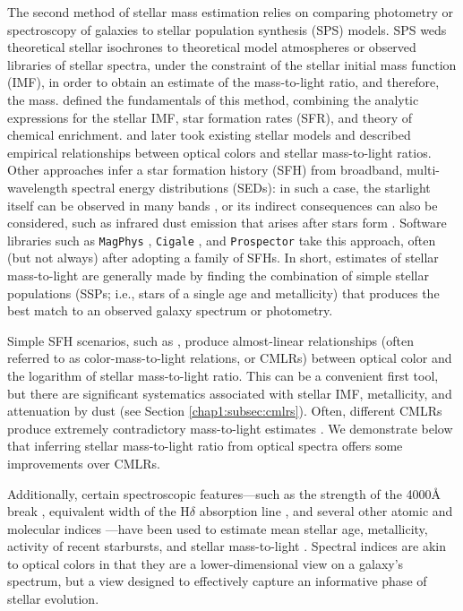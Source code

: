 The second method of stellar mass estimation relies on comparing photometry or spectroscopy of galaxies to stellar population synthesis (SPS) models. SPS weds theoretical stellar isochrones to theoretical model atmospheres or observed libraries of stellar spectra, under the constraint of the stellar initial mass function (IMF), in order to obtain an estimate of the mass-to-light ratio, and therefore, the mass. \citet{tinsley_72,tinsley_73} defined the fundamentals of this method, combining the analytic expressions for the stellar IMF, star formation rates (SFR), and theory of chemical enrichment. \citet{bell_dejong_01} and \citet{bell_03} later took existing stellar models and described empirical relationships between optical colors and stellar mass-to-light ratios. Other approaches infer a star formation history (SFH) from broadband, multi-wavelength spectral energy distributions (SEDs): in such a case, the starlight itself can be observed in many bands \citep{shapley_05_seds}, or its indirect consequences can also be considered, such as infrared dust emission that arises after stars form \citep{dale_01_infrared_dust}. Software libraries such as \texttt{MagPhys} \citep{da-cunha_charlot_elbaz_08,da-cunha_charlot_11_magphys}, \texttt{Cigale} \citep{burgarella_05, giovannoli_11, serra_11}, and \texttt{Prospector} \citep{leja_johnson_conroy_van-dokkum_17_prospector} take this approach, often (but not always) after adopting a family of SFHs. In short, estimates of stellar mass-to-light are generally made by finding the combination of simple stellar populations (SSPs; i.e., stars of a single age and metallicity) that produces the best match to an observed galaxy spectrum or photometry.

Simple SFH scenarios, such as \citet{bell_03}, produce almost-linear relationships (often referred to as color-mass-to-light relations, or CMLRs) between optical color and the logarithm of stellar mass-to-light ratio. This can be a convenient first tool, but there are significant systematics associated with stellar IMF, metallicity, and attenuation by dust (see Section \ref{chap1:subsec:cmlrs}). Often, different CMLRs produce extremely contradictory mass-to-light estimates \citep{mcgaugh_schombert_schombert_14}. We demonstrate below that inferring stellar mass-to-light ratio from optical spectra offers some improvements over CMLRs.

Additionally, certain spectroscopic features---such as the strength of the 4000$\mbox{\AA}$ break \cite[\Dn:][]{bruzual_83, balogh_99, balogh_00}, equivalent width of the H$\delta$ absorption line \citep[\HdeltaA:][]{worthey_ottaviani_97}, and several other atomic and molecular indices \citep[e.g. CN, Mg$b$, NaD:][]{worthey_94}---have been used to estimate mean stellar age, metallicity, activity of recent starbursts, and stellar mass-to-light \citep{kauffmann_heckman_white_03,gallazzi_charlot_05,silchenko_06,wild_kauffmann_07_pca}. Spectral indices are akin to optical colors in that they are a lower-dimensional view on a galaxy's spectrum, but a view designed to effectively capture an informative phase of stellar evolution.

